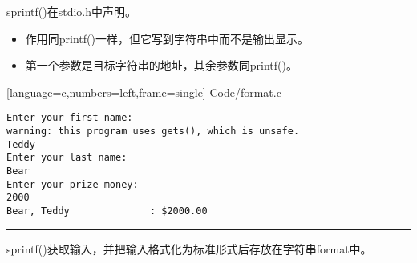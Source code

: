 \begin{frame}[fragile]
{\tf sprintf()}在{\tf stdio.h}中声明。 \vspace{.05in}

\begin{itemize}
\item 
作用同{\tf printf()}一样，但它写到字符串中而不是输出显示。 \\[0.1in]
\item
第一个参数是目标字符串的地址，其余参数同{\tf printf()}。
\end{itemize}
\end{frame}


\begin{frame}

[language=c,numbers=left,frame=single]
{Code/format.c}
\end{frame}


\begin{frame}[fragile]
\begin{lstlisting}[backgroundcolor=\color{blue!20}]
Enter your first name:
warning: this program uses gets(), which is unsafe.
Teddy
Enter your last name:
Bear
Enter your prize money:
2000
Bear, Teddy              : $2000.00

\end{lstlisting}

\pause \rule{\textwidth}{0.3mm}\vspace{0.3mm}

{\tf sprintf()}获取输入，并把输入格式化为标准形式后存放在字符串{\tf format}中。

\end{frame}